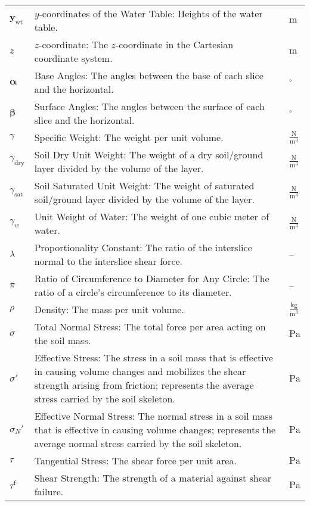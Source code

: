 \documentclass[12pt]{article}
\begin{document}
\begin{longtabu}{l X[l] l}
\\
${\symbf{y}_{\text{wt}}}$ & $y$-coordinates of the Water Table: Heights of the water table. & ${\text{m}}$
\\
$z$ & $z$-coordinate: The $z$-coordinate in the Cartesian coordinate system. & ${\text{m}}$
\\
$\symbf{α}$ & Base Angles: The angles between the base of each slice and the horizontal. & ${{}^{\circ}}$
\\
$\symbf{β}$ & Surface Angles: The angles between the surface of each slice and the horizontal. & ${{}^{\circ}}$
\\
$γ$ & Specific Weight: The weight per unit volume. & $\frac{\text{N}}{\text{m}^{3}}$
\\
${γ_{\text{dry}}}$ & Soil Dry Unit Weight: The weight of a dry soil/ground layer divided by the volume of the layer. & $\frac{\text{N}}{\text{m}^{3}}$
\\
${γ_{\text{sat}}}$ & Soil Saturated Unit Weight: The weight of saturated soil/ground layer divided by the volume of the layer. & $\frac{\text{N}}{\text{m}^{3}}$
\\
${γ_{w}}$ & Unit Weight of Water: The weight of one cubic meter of water. & $\frac{\text{N}}{\text{m}^{3}}$
\\
$λ$ & Proportionality Constant: The ratio of the interslice normal to the interslice shear force. & --
\\
$π$ & Ratio of Circumference to Diameter for Any Circle: The ratio of a circle's circumference to its diameter. & --
\\
$ρ$ & Density: The mass per unit volume. & $\frac{\text{kg}}{\text{m}^{3}}$
\\
$σ$ & Total Normal Stress: The total force per area acting on the soil mass. & ${\text{Pa}}$
\\
$σ'$ & Effective Stress: The stress in a soil mass that is effective in causing volume changes and mobilizes the shear strength arising from friction; represents the average stress carried by the soil skeleton. & ${\text{Pa}}$
\\
${σ_{N}}'$ & Effective Normal Stress: The normal stress in a soil mass that is effective in causing volume changes; represents the average normal stress carried by the soil skeleton. & ${\text{Pa}}$
\\
$τ$ & Tangential Stress: The shear force per unit area. & ${\text{Pa}}$
\\
${τ^{\text{f}}}$ & Shear Strength: The strength of a material against shear failure. & ${\text{Pa}}$
\\

\end{longtabu}
\end{document}
